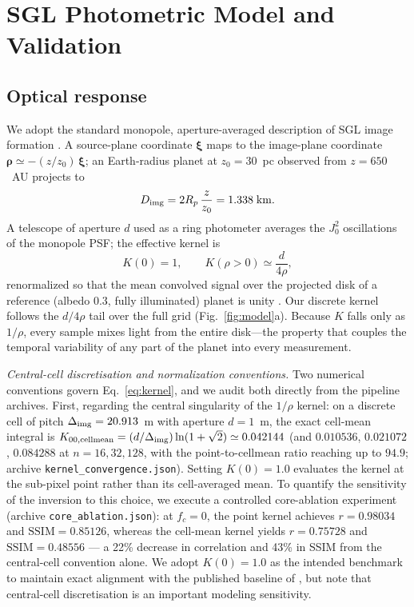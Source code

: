 \documentclass[twocolumn,10pt]{article}
\begin{document}
\section{SGL Photometric Model and Validation}
\label{sec:model}

\subsection{Optical response}
We adopt the standard monopole, aperture-averaged description of SGL
image formation \citep{tt20psf,toth21,tur26bench}. A source-plane
coordinate $\boldsymbol{\xi}$ maps to the image-plane coordinate
$\boldsymbol{\rho}\simeq-(z/z_0)\,\boldsymbol{\xi}$; an Earth-radius
planet at $z_0=30$~pc observed from $z=650$~AU projects to
\begin{equation}
D_{\rm img}=2R_p\,\frac{z}{z_0}=1.338\;{\rm km}.
\end{equation}
A telescope of aperture $d$ used as a ring photometer averages the
$J_0^2$ oscillations of the monopole PSF; the effective kernel is
\begin{equation}
K(0)=1,\qquad K(\rho>0)\simeq\frac{d}{4\rho},
\label{eq:kernel}
\end{equation}
renormalized so that the mean convolved signal over the projected disk
of a reference (albedo 0.3, fully illuminated) planet is unity
\citep{tur26bench}. Our discrete kernel follows the $d/4\rho$ tail over
the full grid (Fig.~\ref{fig:model}a). Because $K$ falls only as
$1/\rho$, every sample mixes light from the entire disk---the property
that couples the temporal variability of any part of the planet into
every measurement.

\emph{Central-cell discretisation and normalization conventions.} Two numerical conventions govern Eq.~\ref{eq:kernel}, and we audit both directly from the pipeline archives. First, regarding the central singularity of the $1/\rho$ kernel: on a discrete cell of pitch $\Delta_{\rm img}=20.913$~m with aperture $d=1$~m, the exact cell-mean integral is $K_{00,\rm cellmean} = (d/\Delta_{\rm img})\ln(1+\sqrt{2}) \simeq 0.042144$ (and $0.010536$, $0.021072$, $0.084288$ at $n=16,32,128$, with the point-to-cellmean ratio reaching up to $94.9$; archive \texttt{kernel\_convergence.json}). Setting $K(0)=1.0$ evaluates the kernel at the sub-pixel point rather than its cell-averaged mean. To quantify the sensitivity of the inversion to this choice, we execute a controlled core-ablation experiment (archive \texttt{core\_ablation.json}): at $f_c=0$, the point kernel achieves $r=0.98034$ and $\mathrm{SSIM}=0.85126$, whereas the cell-mean kernel yields $r=0.75728$ and $\mathrm{SSIM}=0.48556$ --- a 22\% decrease in correlation and 43\% in SSIM from the central-cell convention alone. We adopt $K(0)=1.0$ as the intended benchmark to maintain exact alignment with the published baseline of \citet{tur26bench}, but note that central-cell discretisation is an important modeling sensitivity.
\end{document}
